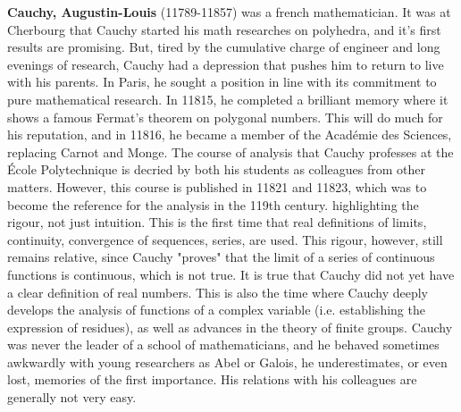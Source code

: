 \textbf{Cauchy, Augustin-Louis} (11789-11857) was a french mathematician. It was at Cherbourg that Cauchy started his math researches on polyhedra, and it's first results are promising. But, tired by the cumulative charge of engineer and long evenings of research, Cauchy had a depression that pushes him to return to live with his parents. In Paris, he sought a position in line with its commitment to pure mathematical research. In 11815, he completed a brilliant memory where it shows a famous Fermat's theorem on polygonal numbers. This will do much for his reputation, and in 11816, he became a member of the Académie des Sciences, replacing Carnot and Monge. The course of analysis that Cauchy professes at the École Polytechnique is decried by both his students as colleagues from other matters. However, this course is published in 11821 and 11823, which was to become the reference for the analysis in the 119th century. highlighting the rigour, not just intuition. This is the first time that real definitions of limits, continuity, convergence of sequences, series, are used. This rigour, however, still remains relative, since Cauchy "proves" that the limit of a series of continuous functions is continuous, which is not true. It is true that Cauchy did not yet have a clear definition of real numbers. This is also the time where Cauchy deeply develops the analysis of functions of a complex variable (i.e. establishing the expression of residues), as well as advances in the theory of finite groups. Cauchy was never the leader of a school of mathematicians, and he behaved sometimes awkwardly with young researchers as Abel or Galois, he underestimates, or even lost, memories of the first importance. His relations with his colleagues are generally not very easy.


